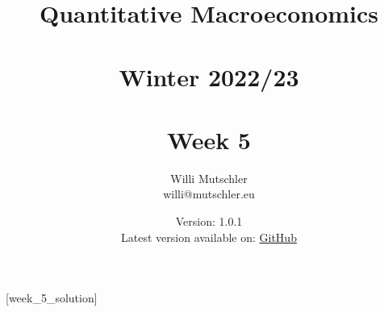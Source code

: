 
\newif\ifDisplaySolutions%


\title{Quantitative Macroeconomics\\~\\Winter 2022/23\\~\\Week 5}
\author{Willi Mutschler\\willi@mutschler.eu}
\date{Version: 1.0.1\\Latest version available on: \href{https://github.com/wmutschl/Quantitative-Macroeconomics/releases/latest/download/week_5.pdf}{GitHub}}
\maketitle\thispagestyle{empty}

\newpage
{}[week_5_solution]
\tableofcontents\thispagestyle{empty}\newpage

\setcounter{page}{1}
\newpage
\newpage
\newpage
\printbibliography
\newpage

\ifDisplaySolutions
\newpage
\appendix
\section{Solutions}

\fi
